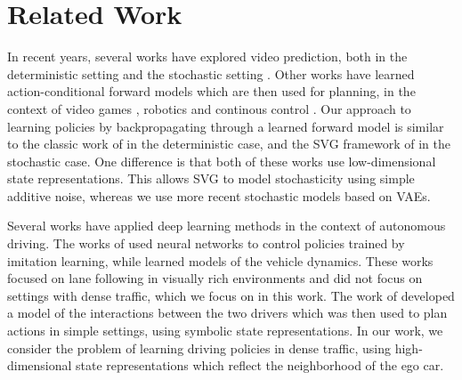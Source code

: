\documentclass{article} %
\begin{document}
\section{Related Work}

In recent years, several works have explored video prediction, both in the deterministic setting \citep{VPN,Srivastava15,DentonB17} and the stochastic setting \citep{mathieu-iclr-2016, Villegas17, Babaeizadeh2018, Denton2018}.
Other works have learned action-conditional forward models which are then used for planning, in the context of video games \citep{Oh15, Pascanu17, I2A}, robotics and continous control \citep{FinnGL16, Poke, Nagabandi2017, UPN}. Our approach to learning policies by backpropagating through a learned forward model is similar to the classic work of \citep{Nguyen1989} in the deterministic case, and the SVG framework of \citep{SVG} in the stochastic case. One difference is that both of these works use low-dimensional state representations. This allows SVG to model stochasticity using simple additive noise, whereas we use more recent stochastic models based on VAEs.

Several works have applied deep learning methods in the context of autonomous driving. The works of \citep{Pomerleau91, Bojarski16, Pan17} used neural networks to control policies trained by imitation learning, while \citep{Williams2017} learned models of the vehicle dynamics. These works focused on lane following in visually rich environments and did not focus on settings with dense traffic, which we focus on in this work. The work of \citep{Sadigh16} developed a model of the interactions between the two drivers which was then used to plan actions in simple settings, using symbolic state representations. In our work, we consider the problem of learning driving policies in dense traffic, using high-dimensional state representations which reflect the neighborhood of the ego car. %


\end{document}
